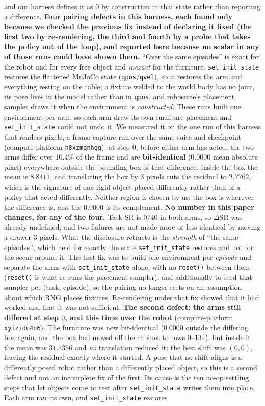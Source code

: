 \documentclass{article}
\begin{document}
and our harness defines it as $0$ by construction in that state rather than reporting a difference. \textbf{Four pairing defects in this harness, each found only because we checked the previous fix instead of declaring it fixed (the first two by re-rendering, the third and fourth by a probe that takes the policy out of the loop), and reported here because no scalar in any of those runs could have shown them.} ``Over the same episodes'' is exact for the robot and for every free object and \emph{inexact} for the furniture. \texttt{set\_init\_state} restores the flattened MuJoCo state (\texttt{qpos}/\texttt{qvel}), so it restores the arm and everything resting on the table; a fixture welded to the world body has no joint, its pose lives in the model rather than in \texttt{qpos}, and robosuite's placement sampler draws it when the environment is \emph{constructed}. These runs built one environment per arm, so each arm drew its own furniture placement and \texttt{set\_init\_state} could not undo it. We measured it on the one run of this harness that renders pixels, a frame-capture run over the same suite and checkpoint (compute-platform \texttt{h8xzmqnhgg}): at step $0$, before either arm has acted, the two arms differ over $10.4\%$ of the frame and are \textbf{bit-identical} ($0.0000$ mean absolute pixel) everywhere outside the bounding box of that difference. Inside the box the mean is $8.8411$, and translating the box by $3$ pixels cuts the residual to $2.7762$, which is the signature of one rigid object placed differently rather than of a policy that acted differently. Neither region is chosen by us: the box is wherever the difference is, and the $0.0000$ is its complement. \textbf{No number in this paper changes, for any of the four.} Task SR is $0/40$ in both arms, so $\Delta$SR was already undefined, and two failures are not made more or less identical by moving a drawer $3$ pixels. What the disclosure retracts is the \emph{strength} of ``the same episodes'', which held for exactly the state \texttt{set\_init\_state} restores and not for the scene around it. The first fix was to build one environment per \emph{episode} and separate the arms with \texttt{set\_init\_state} alone, with no \texttt{reset()} between them (\texttt{reset()} is what re-runs the placement sampler), and additionally to seed that sampler per (task, episode), so the pairing no longer rests on an assumption about which RNG places fixtures. Re-rendering under that fix showed that it had worked and that it was not sufficient. \textbf{The second defect: the arms still differed at step $0$, and this time over the robot} (compute-platform \texttt{xyiztdu4n6}). The furniture was now bit-identical ($0.0000$ outside the differing box again, and the box had moved off the cabinet to rows $0$--$134$), but inside it the mean was $31.7356$ and \emph{no} translation reduced it: the best shift was $(0,0)$, leaving the residual exactly where it started. A pose that no shift aligns is a differently posed robot rather than a differently placed object, so this is a second defect and not an incomplete fix of the first. Its cause is the ten no-op settling steps that let objects come to rest after \texttt{set\_init\_state} writes them into place. Each arm ran its own, and \texttt{set\_init\_state} restores 
\end{document}
